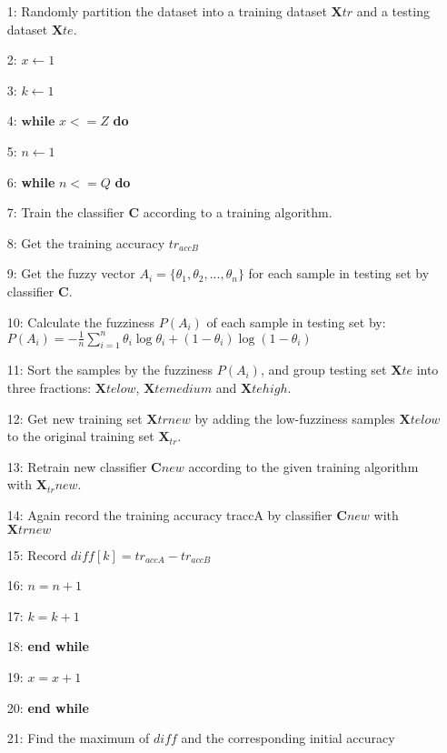 \documentclass{article}
\begin{document}
		\begin{enumerate}
			\small \item[1:] Randomly partition the dataset into a training dataset $\textbf{X}{tr}$ and a testing dataset $\textbf{X}{te}$.
			\item[2:] $x \leftarrow 1$
			\item[3:] $k \leftarrow 1$
			\item[4:] $\textbf{while}$ $x<=Z$ \textbf{do}
			\item[5:] 	\hspace{0.5cm}$n \leftarrow 1$
			\item[6:] 	\hspace{0.5cm}\textbf{while} $n<=Q$ \textbf{do}
			\item[7:] 	\hspace{1cm}Train the classifier \textbf{C} according to a training algorithm.
			\item[8:] 	\hspace{1cm}Get the training accuracy $tr_{accB}$
			\item[9:] 	\hspace{1cm}Get the fuzzy vector $A_i = \{\theta_1, \theta_2,... , \theta_n\}$ for each sample in testing set by classifier \textbf{C}.
			\item[10:] 	\hspace{1cm}Calculate the fuzziness $P(A_i)$ of each sample in testing set by:$ P(A_i) = -\frac{1}{n}\sum_{i=1}^{n} \theta_i \log\theta_i + (1 - \theta_i) \log(1 - \theta_i) $
			\item[11:] 	\hspace{1cm}Sort the samples by the fuzziness $P(A_i)$, and group testing set $\textbf{X}{te}$ into three fractions: $\textbf{X}{te}low$, $\textbf{X}{te}medium$ and $\textbf{X}{te}high$.
			\item[12:]	\hspace{1cm}Get new training set $\textbf{X}{tr}new$ by adding the low-fuzziness samples $\textbf{X}{te}low$ to the original training set $\textbf{X}_{tr}$.
			\item[13:] 	\hspace{1cm}Retrain new classifier $\textbf{C}{new}$ according to the given training algorithm with $\textbf{X}_{tr}new$.
			\item[14:] 	\hspace{1cm}Again record the training accuracy traccA by classifier $\textbf{C}{new}$ with $\textbf{X}{tr}new$
			\item[15:] 	\hspace{1cm}Record $diff[k] = tr_{accA}-tr_{accB}$
			\item[16:]	\hspace{1cm}$n=n+1$
			\item[17:] 	\hspace{1cm}$k=k+1$
			\item[18:] 	\hspace{0.5cm}\textbf{end while}
			\item[19:]	\hspace{0.5cm}$x=x+1$
			\item[20:] \textbf{end while}
			\item[21:] Find the maximum of $diff$ and the corresponding initial accuracy
		\end{enumerate}
\end{document}
